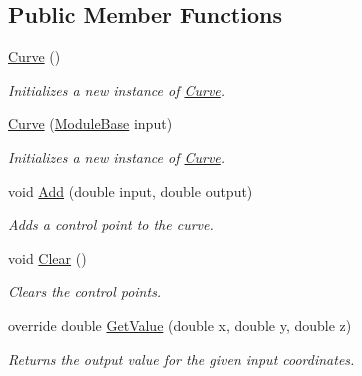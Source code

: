 \subsection*{Public Member Functions}
\begin{DoxyCompactItemize}
\item 
\hyperlink{class_lib_noise_1_1_operator_1_1_curve_ae32d42df5a7a3865c2a3aaa15f40a277}{Curve} ()
\begin{DoxyCompactList}\small\item\em Initializes a new instance of \hyperlink{class_lib_noise_1_1_operator_1_1_curve}{Curve}. \end{DoxyCompactList}\item 
\hyperlink{class_lib_noise_1_1_operator_1_1_curve_a67e6fbd88ca58ea59c2204db591d49bb}{Curve} (\hyperlink{class_lib_noise_1_1_module_base}{Module\+Base} input)
\begin{DoxyCompactList}\small\item\em Initializes a new instance of \hyperlink{class_lib_noise_1_1_operator_1_1_curve}{Curve}. \end{DoxyCompactList}\item 
void \hyperlink{class_lib_noise_1_1_operator_1_1_curve_a74c4b5d7f66a2573ef558d8eafd0a4a9}{Add} (double input, double output)
\begin{DoxyCompactList}\small\item\em Adds a control point to the curve. \end{DoxyCompactList}\item 
void \hyperlink{class_lib_noise_1_1_operator_1_1_curve_ae495ff6ce885a7951cb04343953884d6}{Clear} ()
\begin{DoxyCompactList}\small\item\em Clears the control points. \end{DoxyCompactList}\item 
override double \hyperlink{class_lib_noise_1_1_operator_1_1_curve_a82dfe40676ac017ae05b5c9e11cdbb74}{Get\+Value} (double x, double y, double z)
\begin{DoxyCompactList}\small\item\em Returns the output value for the given input coordinates. \end{DoxyCompactList}\end{DoxyCompactItemize}
